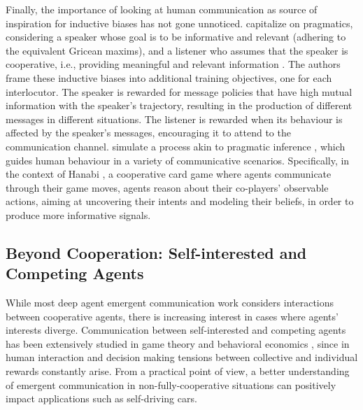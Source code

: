 Finally, the importance of looking at human communication as source of inspiration for inductive biases has not gone unnoticed.  capitalize on pragmatics, considering a speaker whose goal is to be informative and relevant (adhering to the equivalent Gricean maxims), and a listener who assumes that the speaker is cooperative, i.e., providing meaningful and relevant information \cite{Grice:1975}.  The authors frame these inductive biases into additional training objectives, one for each interlocutor. The speaker is rewarded for message policies that have high mutual information with the speaker's trajectory,  resulting in the production of different messages in different situations. The listener is rewarded when its behaviour is affected by the speaker's messages, encouraging it to attend to the communication channel.  simulate a process akin to pragmatic inference \cite{Goodman:Frank:2016}, which guides human behaviour in a variety of communicative scenarios. Specifically,  in the context of Hanabi \cite{Bard:etal:2020}, a cooperative card game where agents communicate through their game moves, agents reason about their co-players' observable actions, aiming at uncovering their intents and modeling their beliefs, in order to produce more informative signals.

\subsection{Beyond Cooperation: Self-interested and Competing Agents}

While most deep agent emergent communication work considers
interactions between cooperative agents, there is increasing interest in cases where
agents' interests diverge. Communication between self-interested and
competing agents has been extensively studied in game theory and
behavioral economics \cite{Crawford:Sobel:1982}, since in human
interaction and decision making tensions between collective and
individual rewards constantly arise. From a practical point of view, a
better understanding of emergent communication in
non-fully-cooperative situations can positively impact applications
such as self-driving cars.

